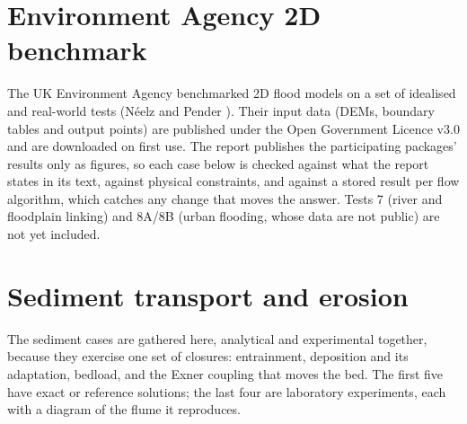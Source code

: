 \chapter{Environment Agency 2D benchmark} \label{ch:ea}
The UK Environment Agency benchmarked 2D flood models on a set of
idealised and real-world tests (N\'eelz and Pender
\cite{NeelzPender2013}). Their input data (DEMs, boundary tables and
output points) are published under the Open Government Licence v3.0 and
are downloaded on first use. The report publishes the participating
packages' results only as figures, so each case below is checked against
what the report states in its text, against physical constraints, and
against a stored result per flow algorithm, which catches any change that
moves the answer. Tests 7 (river and floodplain linking) and 8A/8B (urban
flooding, whose data are not public) are not yet included.

\algpanelsinrows


\algpanelsacross

\chapter{Sediment transport and erosion} \label{ch:sediment}

The sediment cases are gathered here, analytical and experimental together,
because they exercise one set of closures: entrainment, deposition and its
adaptation, bedload, and the Exner coupling that moves the bed. The first
five have exact or reference solutions; the last four are laboratory
experiments, each with a diagram of the flume it reproduces.



